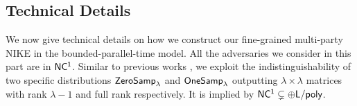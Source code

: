 \subsection{Technical Details}
\label{sec:overview}
We now give technical details on how we construct our fine-grained multi-party NIKE in the bounded-parallel-time model. All the adversaries we consider in this part are in $\mathsf{NC^1}$.
Similar to previous works \cite{C:DegVaiVas16,TCC:CamGen18,C:BalDacKul20,C:WanPanChe21,JC:EgaWanTan21,EC:WanPan22}, we exploit the indistinguishability of two specific distributions ${\mathsf{ZeroSamp}}_\lambda$ and ${\mathsf{OneSamp}}_\lambda$ outputting $\lambda\times\lambda$ matrices with rank $\lambda-1$ and full rank respectively. It is implied by $\mathsf{NC^1} \subsetneq {\sf \oplus L/poly}$.

